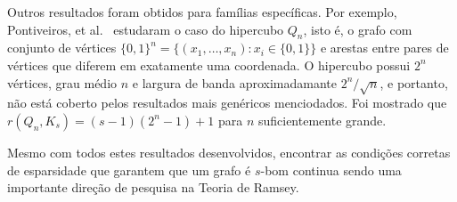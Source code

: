 Outros resultados foram obtidos para famílias específicas. Por exemplo, Pontiveiros, et al.~\cite{pontiveros2014ramsey} estudaram o caso do hipercubo $Q_n$, isto é, o grafo com conjunto de vértices $\{ 0, 1 \}^n = \{ (x_1, \dots, x_n) : x_i \in \{ 0,1 \} \}$ e arestas entre pares de vértices que diferem em exatamente uma coordenada. O hipercubo possui $2^n$ vértices, grau médio $n$ e largura de banda aproximadamante $2^n/\sqrt{n}$, e portanto, não está coberto pelos resultados mais genéricos menciodados.
Foi mostrado que $r(Q_n, K_s) = (s-1)(2^n -1) + 1$ para $n$ suficientemente grande.

Mesmo com todos estes resultados desenvolvidos, encontrar as condições corretas de esparsidade que garantem que um grafo é $s$-bom continua sendo uma importante direção de pesquisa na Teoria de Ramsey.



